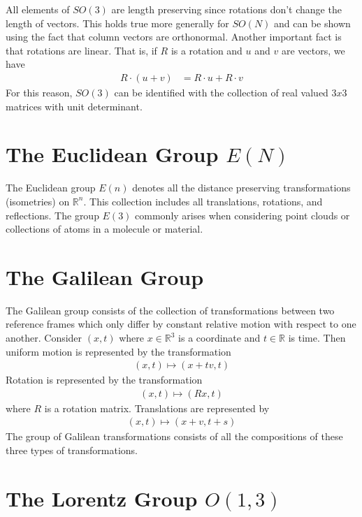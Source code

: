 \documentclass[book.tex]{subfiles}
\begin{document}
All elements of $SO(3)$ are length preserving since rotations don't change the length of vectors. This holds true more generally for $SO(N)$ and can be shown using the fact that column vectors are orthonormal. Another important fact is that rotations are linear. That is, if $R$ is a rotation and $u$ and $v$ are vectors, we have
\begin{align}
R \cdot (u + v) &= R \cdot u + R \cdot v
\end{align}
For this reason, $SO(3)$ can be identified with the collection of real valued $3x3$ matrices with unit determinant.


\section{The Euclidean Group $E(N)$}

The Euclidean group $E(n)$ denotes all the distance preserving transformations (isometries) on $\mathbb{R}^n$. This collection includes all translations, rotations, and reflections. The group $E(3)$ commonly arises when considering point clouds or collections of atoms in a molecule or material.

\section{The Galilean Group}

The Galilean group consists of the collection of transformations between two reference frames which only differ by constant relative motion with respect to one another. Consider $(x, t)$ where $x \in \mathbb{R}^3$ is a coordinate and $t \in \mathbb{R}$ is time. Then uniform motion is represented by the transformation
\begin{align}
(x, t) \mapsto (x + tv, t)
\end{align}
Rotation is represented by the transformation
\begin{align}
(x, t) \mapsto (R x, t)
\end{align}
where $R$ is a rotation matrix. Translations are represented by
\begin{align}
(x, t) \mapsto (x + v, t + s)
\end{align}
The group of Galilean transformations consists of all the compositions of these three types of transformations. 

\section{The Lorentz Group $O(1, 3)$}
\end{document}
